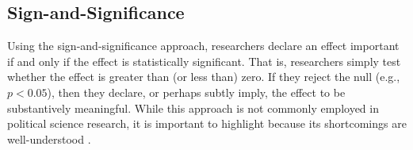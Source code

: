 \documentclass[12pt]{article}
\begin{document}



\subsection*{Sign-and-Significance}

Using the sign-and-significance approach, researchers declare an effect important if and only if the effect is statistically significant. That is, researchers simply test whether the effect is greater than (or less than) zero. If they reject the null (e.g., $p < 0.05$), then they declare, or perhaps subtly imply, the effect to be substantively meaningful. While this approach is not commonly employed in political science research, it is important to highlight because its shortcomings are well-understood \citep{Gill1999}.
\end{document}
